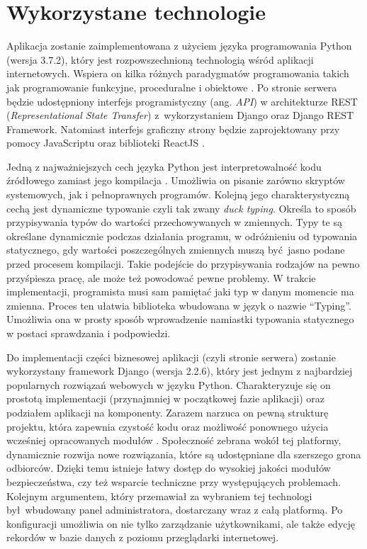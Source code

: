 \section{Wykorzystane technologie}
Aplikacja zostanie zaimplementowana z użyciem języka programowania Python (wersja 3.7.2), który jest rozpowszechnioną technologią wśród aplikacji internetowych. Wspiera on kilka różnych paradygmatów programowania takich jak programowanie funkcyjne, proceduralne i obiektowe \cite{book_3}. Po stronie serwera będzie udostępniony interfejs programistyczny (ang. \textit{API}) w architekturze REST (\textit{Representational State Transfer}) z~wykorzystaniem Django oraz Django REST Framework. Natomiast interfejs graficzny strony będzie zaprojektowany przy pomocy JavaScriptu \cite{misc_js} oraz biblioteki ReactJS \cite{misc_react}.

Jedną z najważniejszych cech języka Python jest interpretowalność kodu źródłowego zamiast jego kompilacja \cite{misc_python}. Umożliwia on pisanie zarówno skryptów systemowych, jak i pełnoprawnych programów. Kolejną jego charakterystyczną cechą jest dynamiczne typowanie czyli tak zwany \textit{duck typing}. Określa to sposób przypisywania typów do wartości przechowywanych w zmiennych. Typy te są określane dynamicznie podczas działania programu, w odróżnieniu od typowania statycznego, gdy wartości poszczególnych zmiennych muszą być jasno podane przed procesem kompilacji. Takie podejście do przypisywania rodzajów na pewno przyśpiesza pracę, ale może też powodować pewne problemy. W trakcie implementacji, programista musi sam pamiętać jaki typ w danym momencie ma zmienna. Proces ten ułatwia biblioteka wbudowana w język o nazwie \enquote{Typing}. Umożliwia ona w prosty sposób wprowadzenie namiastki typowania statycznego w postaci sprawdzania i podpowiedzi.

Do implementacji części biznesowej aplikacji (czyli stronie serwera) zostanie wykorzystany framework Django (wersja 2.2.6), który jest jednym z najbardziej popularnych rozwiązań webowych w języku Python. Charakteryzuje się on prostotą implementacji (przynajmniej w początkowej fazie aplikacji) oraz podziałem aplikacji na komponenty. Zarazem narzuca on pewną strukturę projektu, która zapewnia czystość kodu oraz możliwość ponownego użycia wcześniej opracowanych modułów \cite{misc_django}. Społeczność zebrana wokół tej platformy, dynamicznie rozwija nowe rozwiązania, które są udostępniane dla szerszego grona odbiorców. Dzięki temu istnieje łatwy dostęp do wysokiej jakości modułów bezpieczeństwa, czy też wsparcie techniczne przy występujących problemach. Kolejnym argumentem, który przemawiał za wybraniem tej technologi był wbudowany panel administratora, dostarczany wraz z całą platformą. Po konfiguracji umożliwia on nie tylko zarządzanie użytkownikami, ale także edycję rekordów w bazie danych z poziomu przeglądarki internetowej. 

